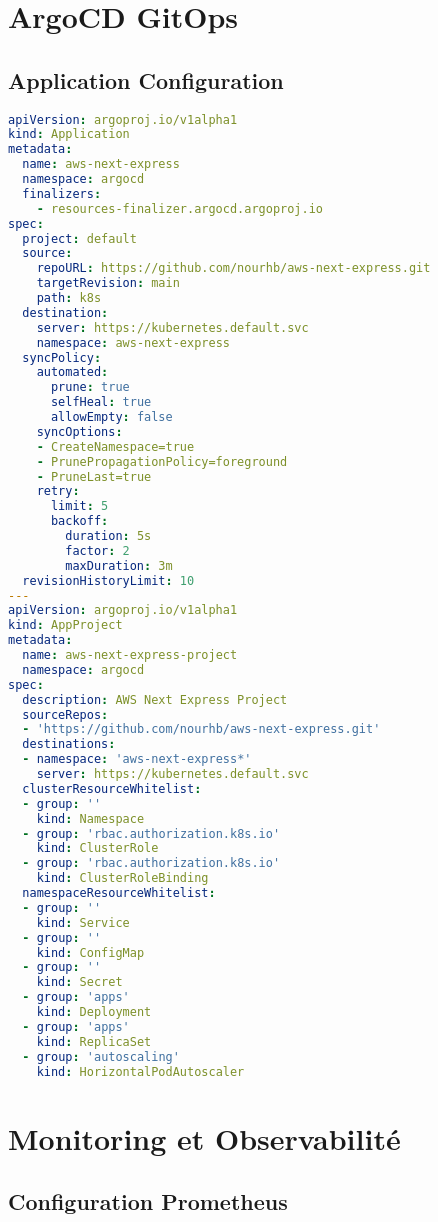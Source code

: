 \section{ArgoCD GitOps}

\subsection{Application Configuration}

\begin{lstlisting}[language=YAML, caption=argocd/application.yaml]
apiVersion: argoproj.io/v1alpha1
kind: Application
metadata:
  name: aws-next-express
  namespace: argocd
  finalizers:
    - resources-finalizer.argocd.argoproj.io
spec:
  project: default
  source:
    repoURL: https://github.com/nourhb/aws-next-express.git
    targetRevision: main
    path: k8s
  destination:
    server: https://kubernetes.default.svc
    namespace: aws-next-express
  syncPolicy:
    automated:
      prune: true
      selfHeal: true
      allowEmpty: false
    syncOptions:
    - CreateNamespace=true
    - PrunePropagationPolicy=foreground
    - PruneLast=true
    retry:
      limit: 5
      backoff:
        duration: 5s
        factor: 2
        maxDuration: 3m
  revisionHistoryLimit: 10
---
apiVersion: argoproj.io/v1alpha1
kind: AppProject
metadata:
  name: aws-next-express-project
  namespace: argocd
spec:
  description: AWS Next Express Project
  sourceRepos:
  - 'https://github.com/nourhb/aws-next-express.git'
  destinations:
  - namespace: 'aws-next-express*'
    server: https://kubernetes.default.svc
  clusterResourceWhitelist:
  - group: ''
    kind: Namespace
  - group: 'rbac.authorization.k8s.io'
    kind: ClusterRole
  - group: 'rbac.authorization.k8s.io'
    kind: ClusterRoleBinding
  namespaceResourceWhitelist:
  - group: ''
    kind: Service
  - group: ''
    kind: ConfigMap
  - group: ''
    kind: Secret
  - group: 'apps'
    kind: Deployment
  - group: 'apps'
    kind: ReplicaSet
  - group: 'autoscaling'
    kind: HorizontalPodAutoscaler
\end{lstlisting}

\section{Monitoring et Observabilité}

\subsection{Configuration Prometheus}

